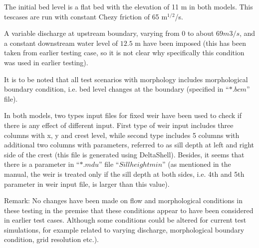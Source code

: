 The initial bed level is a flat bed with the elevation of 11 m in both models. This tescases are run with constant Chezy friction of 65 m$^{1/2}$/s. 

A variable discharge at upstream boundary, varying from $0$ to about $69 m3/s$, and a constant downstream water level of $12.5$ m have been imposed (this has been taken from earlier testing case, so it is not clear why specifically this condition was used in earlier testing). 

It is to be noted that all test scenarios with morphology includes morphological boundary condition, i.e. bed level changes at the boundary (specified in $“*.bcm”$ file).  

In both models, two types input files for fixed weir have been used to check if there is any effect of different input. First type of weir input includes three columns with x, y and crest level, while second type includes 5 columns with additional two columns with parameters, referred to as sill depth at left and right side of the crest (this file is generated using DeltaShell). Besides, it seems that there is a parameter in $“*.mdu”$ file $“Sillheightmin”$ (as mentioned in the manual, the weir is treated only if the sill depth at both sides, i.e. 4th and 5th parameter in weir input file, is larger than this value).    

Remark: No changes have been made on flow and morphological conditions in these testing in the premise that these conditions appear to have been considered in earlier test cases. Although some conditions could be altered for current test simulations, for example related to varying discharge, morphological boundary condition, grid resolution etc.). 

